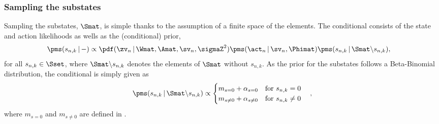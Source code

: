 \documentclass{article}
\begin{document}
\subsubsection{Sampling the substates}
Sampling the substates, $\Smat$, is simple thanks to the assumption of a finite space of the elements. The conditional consists of the state and action likelihoods as wells as the (conditional) prior,
\begin{align}
 \begin{split}
 \pms(s_{n,k}\,|\,-) & \propto \pdf(\zv_n \,|\, \Wmat,\Amat, \sv_n, \sigmaZ^2)
                   \pms(\act_n\,|\, \sv_n, \Phimat) \pms(  s_{n,k} \,|\, \Smat \backslash s_{n,k} ),
 \end{split}
 \label{eq::inf::s} 
\end{align}
for all $s_{n,k} \in \Sset$, where $\Smat \backslash s_{n,k}$ denotes the elements of $\Smat$ without $s_{n,k}$. As the prior for the substates follows a Beta-Binomial distribution, the conditional is simply given as 
\begin{align*}
 \pms(  s_{n,k} \,|\, \Smat \backslash s_{n,k} ) \propto \begin{cases}
			m_{s=0} + \alpha_{s=0}   \quad \text{for $s_{n,k} = 0$}
			\\ m_{s\neq0} + \alpha_{s\neq0} \quad \text{for $s_{n,k}\neq0$}
                     \end{cases},
\end{align*}
where $m_{s=0}$ and $m_{s\neq0}$ are defined in .
\end{document}

